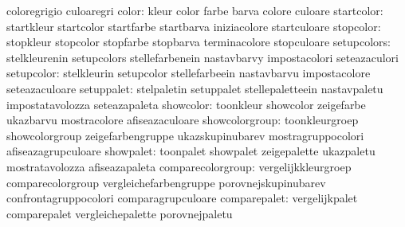                                   coloregrigio                     culoaregri
                          color:  kleur                            color
                                  farbe                            barva
                                  colore                           culoare
                     startcolor:  startkleur                       startcolor
                                  startfarbe                       startbarva
                                  iniziacolore                     startculoare
                      stopcolor:  stopkleur                        stopcolor
                                  stopfarbe                        stopbarva
                                  terminacolore                    stopculoare
                    setupcolors:  stelkleurenin                    setupcolors
                                  stellefarbenein                  nastavbarvy
                                  impostacolori                    seteazaculori
                     setupcolor:  stelkleurin                      setupcolor
                                  stellefarbeein                   nastavbarvu
                                  impostacolore                    seteazaculoare
                     setuppalet:  stelpaletin                      setuppalet
                                  stellepaletteein                 nastavpaletu
                                  impostatavolozza                 seteazapaleta
                      showcolor:  toonkleur                        showcolor
                                  zeigefarbe                       ukazbarvu
                                  mostracolore                     afiseazaculoare
                 showcolorgroup:  toonkleurgroep                   showcolorgroup
                                  zeigefarbengruppe                ukazskupinubarev
                                  mostragruppocolori               afiseazagrupculoare
                      showpalet:  toonpalet                        showpalet
                                  zeigepalette                     ukazpaletu
                                  mostratavolozza                  afiseazapaleta
              comparecolorgroup:  vergelijkkleurgroep              comparecolorgroup
                                  vergleichefarbengruppe           porovnejskupinubarev
                                  confrontagruppocolori            comparagrupculoare
                   comparepalet:  vergelijkpalet                   comparepalet
                                  vergleichepalette                porovnejpaletu
